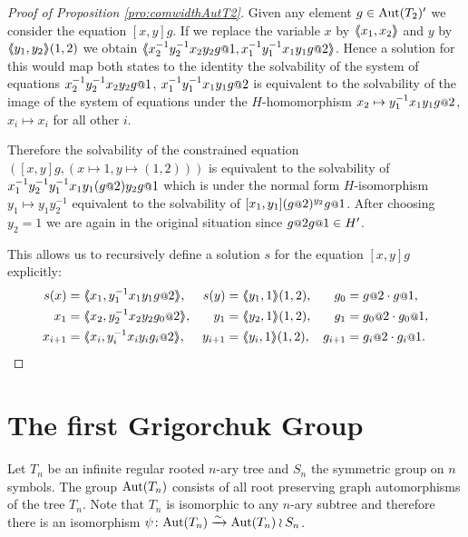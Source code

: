 \documentclass[a4paper,11pt]{amsart}
\begin{document}
\begin{proof}[Proof of Proposition \ref{pro:comwidthAutT2}]
 Given any element $g\in \textup{Aut}(T_2)'$ we consider the equation $[x,y]g$.
 If we replace the variable $x$ by $\langle\negthickspace\langle x_1,x_2\rangle\negthickspace\rangle$ and $y$ by $\langle\negthickspace\langle y_1,y_2\rangle\negthickspace\rangle(1,2)$ 
 we obtain $\pair{x_2^{-1}y_2^{-1}x_2y_2g\at{1},x_1^{-1}y_1^{-1}x_1y_1g\at{2}}$. Hence a 
 solution for this would map both states to the identity the solvability of 
 the system of equations $x_2^{-1}y_2^{-1}x_2y_2g\at{1}$, $x_1^{-1}y_1^{-1}x_1y_1g\at{2}$
 is equivalent to the solvability of the image of the system of equations under 
 the $H$-homomorphism $x_2\mapsto y_1^{-1}x_1y_1 g\at{2}$, $x_i\mapsto x_i$ 
 for all other $i$. 
 
 Therefore the solvability of the constrained equation
 $\left([x,y]g, (x\mapsto 1,y\mapsto (1,2)) \right)$ is equivalent to the solvability of
 $x_1^{-1}y_2^{-1}y_1^{-1}x_1y_1(g\at{2}) y_2 g\at{1}$ which is under the 
 normal form $H$-isomorphism $y_1\mapsto y_1y_2^{-1}$ equivalent to the 
 solvability of $[x_1,y_1](g\at{2})^{y_2} g\at{1}$. After choosing $y_2=1$ we are 
 again in the original situation since $g\at{2} g\at{1}\in H'$. 
 
 This allows us to recursively define a solution $s$ for the equation $[x,y]g$ explicitly:
\begin{align*}
  s(x) &= \pair{x_1,y_1^{-1}x_1y_1 g\at{2} }, & s(y) &=\pair{y_1,1}(1,2), &g_0&=g\at{2} \cdot g\at{1}, \\
  x_1 &= \pair{x_{2},y_{2}^{-1}x_{2}y_{2} g_0\at{2} }, & y_1 &=\pair{y_{2},1}(1,2),&g_1&=g_0\at{2} \cdot g_0\at{1}, \\
  x_{i+1} &= \pair{x_{i},y_{i}^{-1}x_{i}y_{i} g_i\at{2} }, & y_{i+1} &=\pair{y_{i},1}(1,2),&g_{i+1}&=g_i\at{2} \cdot g_i\at{1}. 
 \end{align*}
\end{proof}


\section{The first Grigorchuk Group}\label{sec:GrigorchukGroup}
Let $T_n$ be an infinite regular rooted $n$-ary tree and $S_n$ the symmetric group on $n$ symbols.
The group $\textup{Aut}(T_n)$ consists of all root preserving graph automorphisms of the tree $T_n$. 
Note that $T_n$ is isomorphic to any $n$-ary subtree and therefore there is an isomorphism
$\psi\colon \textup{Aut}(T_n)\xrightarrow{\sim} \textup{Aut}(T_n)\wr S_n$. 
\end{document}
